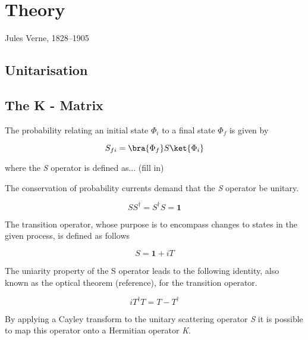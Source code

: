 \chapter{Theory}
\label{chap:theory}

{Jules Verne, 1828--1905}

\section{Unitarisation}
\label{sec:unitarisation}

\section{The K - Matrix}
\label{sec:kmatrix}

The probability relating an initial state $\Phi_{i}$ to a final state $\Phi_{f}$ is given by

\begin{equation}
  S_{fi} = \bra{\Phi_{f}} S \ket{\Phi_{i}}
  \label{eq:sdefinition}
\end{equation}

where the \textit{S} operator is defined as... (fill in)

The conservation of probability currents demand that the \textit{S} operator be unitary.  

\begin{equation}
  SS^{\dagger} = S^{\dagger}S = \textbf{1}
  \label{eq:sunitarity}
\end{equation}

The transition operator, whose purpose is to encompass changes to states in the given process, is defined as follows 

\begin{equation}
   S = \textbf{1} + iT
\label{eq:tdefinition}
\end{equation}

The uniarity property of the S operator leads to the following identity, also known as the optical theorem (reference), for the transition operator.  

\begin{equation}
  iT^{\dagger}T = T - T^{\dagger} 
  \label{eq:opticaltheorem}
\end{equation}

By applying a Cayley transform to the unitary scattering operator \textit{S} it is possible to map this operator onto a Hermitian operator \textit{K}.  


